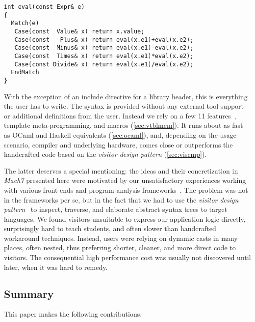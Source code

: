 
\begin{lstlisting}[columns=flexible]
int eval(const Expr& e)
{
  Match(e)
   Case(const  Value& x) return x.value;
   Case(const   Plus& x) return eval(x.e1)+eval(x.e2);
   Case(const  Minus& x) return eval(x.e1)-eval(x.e2);
   Case(const  Times& x) return eval(x.e1)*eval(x.e2);
   Case(const Divide& x) return eval(x.e1)/eval(x.e2);
  EndMatch
}
\end{lstlisting}

\noindent
With the exception of an include directive for a library header, this is everything the user has to write.
The syntax is provided without any external tool support or additional definitions from the user. Instead we rely on a 
few \Cpp{}11 features~\cite{C++11}, template meta-programming, and macros (\textsection\ref{sec:vtblmem}). It runs 
about as fast as OCaml and Haskell equivalents (\textsection\ref{sec:ocaml}), and, depending 
on the usage scenario, compiler and underlying hardware, comes close or 
outperforms the handcrafted \Cpp{} code based on the \emph{visitor design pattern} 
(\textsection\ref{sec:viscmp}).

The latter deserves a special mentioning: the ideas and their concretization in 
\emph{Mach7} presented here were motivated by our unsatisfactory experiences working 
with various \Cpp{} front-ends and program analysis frameworks~\cite{Pivot09,Phoenix,Clang}. 
The problem was not in the frameworks per se, but in the fact that we had to use
the \emph{visitor design pattern}~\cite{DesignPatterns1993} to inspect, traverse, and 
elaborate abstract syntax trees to target languages. We found visitors 
unsuitable to express our application logic directly, surprisingly hard to teach 
students, and often slower than handcrafted workaround techniques. Instead, 
users were relying on dynamic casts in many places, often nested, thus preferring 
shorter, cleaner, and more direct code to visitors. The consequential high 
performance cost was usually not discovered until later, when it was hard to 
remedy.

\subsection{Summary}

This paper makes the following contributions:

